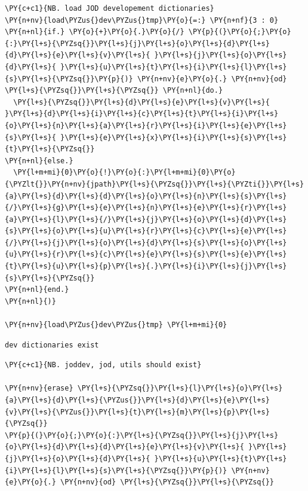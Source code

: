     \begin{tcolorbox}[breakable, size=fbox, boxrule=1pt, pad at break*=1mm,colback=cellbackground, colframe=cellborder]
\begin{Verbatim}[commandchars=\\\{\}]
\PY{c+c1}{NB. load JOD developement dictionaries}
\PY{n+nv}{load\PYZus{}dev\PYZus{}tmp}\PY{o}{=:} \PY{n+nf}{3 : 0}
\PY{n+nl}{if.} \PY{o}{+}\PY{o}{.}\PY{o}{/} \PY{p}{(}\PY{o}{;}\PY{o}{:}\PY{l+s}{\PYZsq{}}\PY{l+s}{j}\PY{l+s}{o}\PY{l+s}{d}\PY{l+s}{d}\PY{l+s}{e}\PY{l+s}{v}\PY{l+s}{ }\PY{l+s}{j}\PY{l+s}{o}\PY{l+s}{d}\PY{l+s}{ }\PY{l+s}{u}\PY{l+s}{t}\PY{l+s}{i}\PY{l+s}{l}\PY{l+s}{s}\PY{l+s}{\PYZsq{}}\PY{p}{)} \PY{n+nv}{e}\PY{o}{.} \PY{n+nv}{od} \PY{l+s}{\PYZsq{}}\PY{l+s}{\PYZsq{}} \PY{n+nl}{do.}
  \PY{l+s}{\PYZsq{}}\PY{l+s}{d}\PY{l+s}{e}\PY{l+s}{v}\PY{l+s}{ }\PY{l+s}{d}\PY{l+s}{i}\PY{l+s}{c}\PY{l+s}{t}\PY{l+s}{i}\PY{l+s}{o}\PY{l+s}{n}\PY{l+s}{a}\PY{l+s}{r}\PY{l+s}{i}\PY{l+s}{e}\PY{l+s}{s}\PY{l+s}{ }\PY{l+s}{e}\PY{l+s}{x}\PY{l+s}{i}\PY{l+s}{s}\PY{l+s}{t}\PY{l+s}{\PYZsq{}}
\PY{n+nl}{else.}
  \PY{l+m+mi}{0}\PY{o}{!}\PY{o}{:}\PY{l+m+mi}{0}\PY{o}{\PYZlt{}}\PY{n+nv}{jpath}\PY{l+s}{\PYZsq{}}\PY{l+s}{\PYZti{}}\PY{l+s}{a}\PY{l+s}{d}\PY{l+s}{d}\PY{l+s}{o}\PY{l+s}{n}\PY{l+s}{s}\PY{l+s}{/}\PY{l+s}{g}\PY{l+s}{e}\PY{l+s}{n}\PY{l+s}{e}\PY{l+s}{r}\PY{l+s}{a}\PY{l+s}{l}\PY{l+s}{/}\PY{l+s}{j}\PY{l+s}{o}\PY{l+s}{d}\PY{l+s}{s}\PY{l+s}{o}\PY{l+s}{u}\PY{l+s}{r}\PY{l+s}{c}\PY{l+s}{e}\PY{l+s}{/}\PY{l+s}{j}\PY{l+s}{o}\PY{l+s}{d}\PY{l+s}{s}\PY{l+s}{o}\PY{l+s}{u}\PY{l+s}{r}\PY{l+s}{c}\PY{l+s}{e}\PY{l+s}{s}\PY{l+s}{e}\PY{l+s}{t}\PY{l+s}{u}\PY{l+s}{p}\PY{l+s}{.}\PY{l+s}{i}\PY{l+s}{j}\PY{l+s}{s}\PY{l+s}{\PYZsq{}}
\PY{n+nl}{end.}
\PY{n+nl}{)}

\PY{n+nv}{load\PYZus{}dev\PYZus{}tmp} \PY{l+m+mi}{0}
\end{Verbatim}
\end{tcolorbox}

    \begin{Verbatim}[commandchars=\\\{\}]
dev dictionaries exist
    \end{Verbatim}

    \begin{tcolorbox}[breakable, size=fbox, boxrule=1pt, pad at break*=1mm,colback=cellbackground, colframe=cellborder]
\begin{Verbatim}[commandchars=\\\{\}]
\PY{c+c1}{NB. joddev, jod, utils should exist}

\PY{n+nv}{erase} \PY{l+s}{\PYZsq{}}\PY{l+s}{l}\PY{l+s}{o}\PY{l+s}{a}\PY{l+s}{d}\PY{l+s}{\PYZus{}}\PY{l+s}{d}\PY{l+s}{e}\PY{l+s}{v}\PY{l+s}{\PYZus{}}\PY{l+s}{t}\PY{l+s}{m}\PY{l+s}{p}\PY{l+s}{\PYZsq{}}
\PY{p}{(}\PY{o}{;}\PY{o}{:}\PY{l+s}{\PYZsq{}}\PY{l+s}{j}\PY{l+s}{o}\PY{l+s}{d}\PY{l+s}{d}\PY{l+s}{e}\PY{l+s}{v}\PY{l+s}{ }\PY{l+s}{j}\PY{l+s}{o}\PY{l+s}{d}\PY{l+s}{ }\PY{l+s}{u}\PY{l+s}{t}\PY{l+s}{i}\PY{l+s}{l}\PY{l+s}{s}\PY{l+s}{\PYZsq{}}\PY{p}{)} \PY{n+nv}{e}\PY{o}{.} \PY{n+nv}{od} \PY{l+s}{\PYZsq{}}\PY{l+s}{\PYZsq{}}
\end{Verbatim}
\end{tcolorbox}

